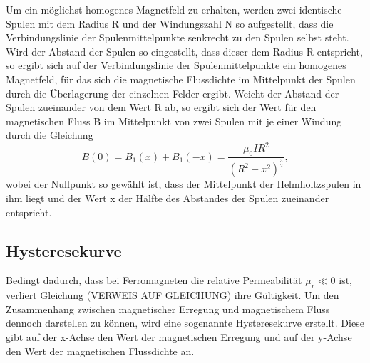 Um ein möglichst homogenes Magnetfeld zu erhalten, werden zwei identische Spulen mit dem Radius R und der Windungszahl N 
so aufgestellt, dass die Verbindungslinie der Spulenmittelpunkte senkrecht zu den Spulen selbst steht. Wird der Abstand 
der Spulen so eingestellt, dass dieser dem Radius R entspricht, so ergibt sich auf der Verbindungslinie der 
Spulenmittelpunkte ein homogenes Magnetfeld, für das sich die magnetische Flussdichte im Mittelpunkt der Spulen durch
die Überlagerung der einzelnen Felder ergibt. 
Weicht der Abstand der Spulen zueinander von dem Wert R ab, so ergibt sich der Wert für den magnetischen Fluss B im 
Mittelpunkt von zwei Spulen mit je einer Windung durch die Gleichung
\begin{equation}
    B(0) = B_1(x) + B_1(-x) = \frac{\mu_0 I R^2}{(R^2 + x^2)^{\frac{3}{2}}},
    \label{eq:b}
\end{equation}
\noindent
wobei der Nullpunkt so gewählt ist, dass der Mittelpunkt der Helmholtzspulen in ihm liegt und der Wert x 
der Hälfte des Abstandes der Spulen zueinander entspricht.




\subsection{Hysteresekurve}

\noindent
Bedingt dadurch, dass bei Ferromagneten die relative Permeabilität $\mu_r \ll 0$ ist, verliert Gleichung (VERWEIS AUF GLEICHUNG)
ihre Gültigkeit. Um den Zusammenhang zwischen magnetischer Erregung und magnetischem Fluss dennoch darstellen zu können, wird
eine sogenannte Hysteresekurve erstellt. Diese gibt auf der x-Achse den Wert der magnetischen Erregung und auf der y-Achse
den Wert der magnetischen Flussdichte an. \\

